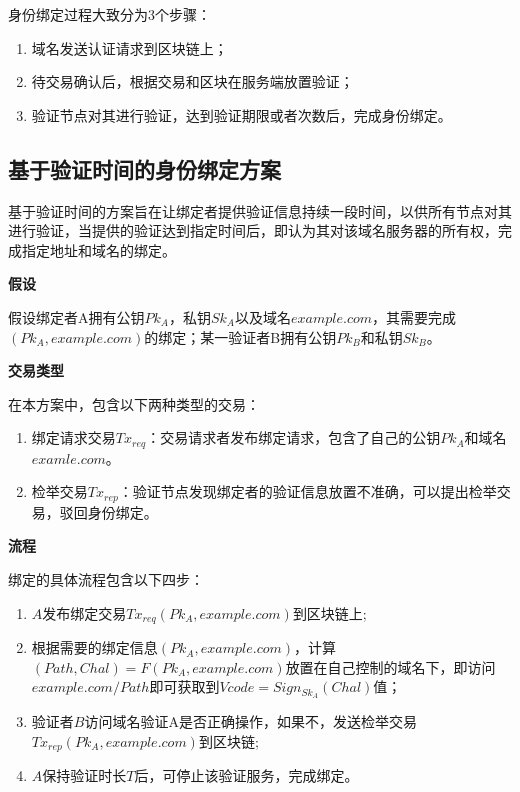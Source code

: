 身份绑定过程大致分为3个步骤：

\begin{enumerate}
	\item 域名发送认证请求到区块链上；
	\item 待交易确认后，根据交易和区块在服务端放置验证；
	\item 验证节点对其进行验证，达到验证期限或者次数后，完成身份绑定。
\end{enumerate}

\subsection{基于验证时间的身份绑定方案}

基于验证时间的方案旨在让绑定者提供验证信息持续一段时间，以供所有节点对其进行验证，当提供的验证达到指定时间后，即认为其对该域名服务器的所有权，完成指定地址和域名的绑定。

\noindent\textbf{假设}

假设绑定者A拥有公钥$Pk_A$，私钥$Sk_A$以及域名$example.com$，其需要完成$(Pk_A, example.com)$的绑定；某一验证者B拥有公钥$Pk_B$和私钥$Sk_B$。

\noindent\textbf{交易类型}

在本方案中，包含以下两种类型的交易：

\begin{enumerate}
	\item 绑定请求交易$Tx_{req}$：交易请求者发布绑定请求，包含了自己的公钥$Pk_A$和域名$examle.com$。
	\item 检举交易$Tx_{rep}$：验证节点发现绑定者的验证信息放置不准确，可以提出检举交易，驳回身份绑定。
\end{enumerate}

\noindent\textbf{流程}

绑定的具体流程包含以下四步：

\begin{enumerate}
	\item $A$发布绑定交易$Tx_{req}(Pk_A, example.com)$到区块链上;
	\item 根据需要的绑定信息$(Pk_A, example.com)$，计算$(Path, Chal) = F(Pk_A, example.com)$放置在自己控制的域名下，即访问$example.com/Path$即可获取到$Vcode = Sign_{Sk_A}(Chal)$值；
	\item 验证者$B$访问域名验证A是否正确操作，如果不，发送检举交易$Tx_{rep}(Pk_A, example.com)$到区块链;
	\item $A$保持验证时长$T$后，可停止该验证服务，完成绑定。
\end{enumerate}

